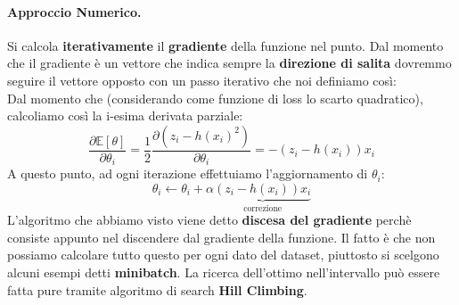 \paragraph{Approccio Numerico.}Si calcola \textbf{iterativamente} il \textbf{gradiente} della funzione nel punto. Dal momento che il gradiente
è un vettore che indica sempre la \textbf{direzione di salita} dovremmo seguire il vettore opposto con un passo iterativo che noi definiamo così:\\
Dal momento che (considerando come funzione di loss lo scarto quadratico), calcoliamo così la i-esima derivata parziale:
\begin{equation}
        \frac{\partial \mathbb{E}[\theta]}{\partial \theta_i} = \frac{1}{2} \frac{\partial(z_i - h(x_i)^2)}{\partial \theta_i} = -(z_i - h(x_i))x_i 
\end{equation}
A questo punto, ad ogni iterazione effettuiamo l'aggiornamento di $\theta_i$:
\begin{equation}
    \theta_i \leftarrow \theta_i + \alpha\underbrace{(z_i - h(x_i))x_i}_{\text{correzione}}
\end{equation}
L'algoritmo che abbiamo visto viene detto \textbf{discesa del gradiente} perchè consiste appunto nel discendere dal gradiente della funzione.
Il fatto è che non possiamo calcolare tutto questo per ogni dato del dataset, piuttosto si scelgono alcuni esempi detti \textbf{minibatch}.
La ricerca dell'ottimo nell'intervallo può essere fatta pure tramite algoritmo di search \textbf{Hill Climbing}.